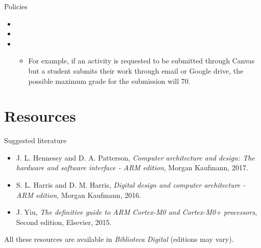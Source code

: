 \documentclass[]{slides}
\begin{document}
\begin{frame}{Policies}
\begin{itemize}
  \item {}
  \item {}
  \item {}
  \begin{itemize}
    \item For example, if an activity is requested to be submitted through Canvas but a student submits their work through email or Google drive, the possible maximum grade for the submission will 70.
  \end{itemize}
\end{itemize}
\end{frame}

\section{Resources}
\begin{frame}{Suggested literature}
\begin{itemize}
\item J. L. Hennessy and D. A. Patterson, \emph{Computer architecture and design: The hardware and software interface - ARM edition}, Morgan Kaufmann, 2017.
\item S. L. Harris and D. M. Harris, \emph{Digital design and computer architecture - ARM edition}, Morgan Kaufmann, 2016.
\item J. Yiu, \emph{The definitive guide to ARM Cortex-M0 and Cortex-M0+ processors}, Second edition, Elsevier, 2015.
\end{itemize}
All these resources are available in \emph{Biblioteca Digital} (editions may vary).
\end{frame}

\end{document}
